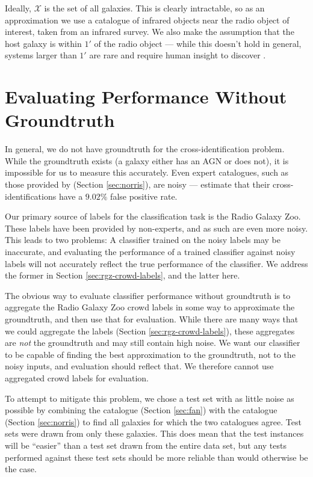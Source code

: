   Ideally, $\mathcal X$ is the set of all galaxies. This is clearly
  intractable, so as an approximation we use a catalogue of infrared objects
  near the radio object of interest, taken from an infrared survey. We also
  make the assumption that the host galaxy is within $1'$ of the radio object
  --- while this doesn't hold in general, systems larger than $1'$ are rare and
  require human insight to discover \citep{banfield16}.

\section{Evaluating Performance Without Groundtruth}
  \label{sec:norris-as-groundtruth}

  In general, we do not have groundtruth for the cross-identification problem.
  While the groundtruth exists (a galaxy either has an AGN or does not), it is
  impossible for us to measure this accurately. Even expert catalogues, such as
  those provided by \citeauthor{norris06} (Section \ref{sec:norris}), are noisy
  --- \citep{norris06} estimate that their cross-identifications have a $9.02\%$
  false positive rate.
  
  Our primary source of labels for the classification task is the Radio Galaxy
  Zoo. These labels have been provided by non-experts, and as such are even more
  noisy. This leads to two problems: A classifier trained on the noisy labels
  may be inaccurate, and evaluating the performance of a trained classifier
  against noisy labels will not accurately reflect the true performance of the
  classifier. We address the former in Section \ref{sec:rgz-crowd-labels}, and
  the latter here.

  The obvious way to evaluate classifier performance without groundtruth is to
  aggregate the Radio Galaxy Zoo crowd labels in some way to approximate the
  groundtruth, and then use that for evaluation. While there are many ways that
  we could aggregate the labels (Section \ref{sec:rgz-crowd-labels}), these
  aggregates are \emph{not} the groundtruth and may still contain high noise. We
  want our classifier to be capable of finding the best approximation to the
  groundtruth, not to the noisy inputs, and evaluation should reflect that. We
  therefore cannot use aggregated crowd labels for evaluation.

  To attempt to mitigate this problem, we chose a test set with as little noise
  as possible by combining the \citeauthor{fan15} catalogue (Section
  \ref{sec:fan}) with the \citeauthor{norris06} catalogue (Section
  \ref{sec:norris}) to find all galaxies for which the two catalogues agree.
  Test sets were drawn from only these galaxies. This does mean that the test
  instances will be ``easier'' than a test set drawn from the entire data set,
  but any tests performed against these test sets should be more reliable than
  would otherwise be the case.

